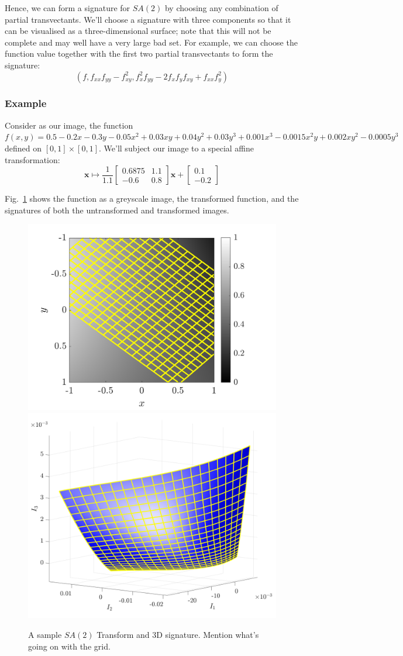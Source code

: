 \documentclass[review,onefignum,onetabnum]{siamonline190516}
\begin{document}
{Hence, we can form a signature for $SA(2)$ by choosing any combination of
partial transvectants. We'll choose a signature with three components so that
it can be visualised as a three-dimensional surface; note that this will not
be complete and may well have a very large bad set. For example, we can choose the function value together with the first two partial transvectants to form the signature:
\begin{equation*}
    \left(f, f_{xx}f_{yy}-f_{xy}^2, f_x^2f_{yy} - 2f_xf_yf_{xy} + f_{xx}f_y^2\right)
\end{equation*}

\subsubsection{Example}
Consider as our image, the function $f(x, y) = 0.5 - 0.2x - 0.3y - 0.05x^2 +
0.03xy + 0.04y^2 + 0.03y^3 +0.001x^3 - 0.0015x^2y + 0.002xy^2 - 0.0005y^3$
defined on $[0, 1]\times[0, 1]$.
We'll subject our image to a special affine transformation:
\begin{equation*}
\mathbf{x} \mapsto \frac{1}{1.1}\begin{bmatrix} 0.6875 & 1.1 \\ -0.6 & 0.8 \end{bmatrix}\mathbf{x} + \begin{bmatrix} 0.1 \\ -0.2 \end{bmatrix}
\end{equation*}

Fig.~\ref{fig:SA2} shows the function as a greyscale image, the transformed
function, and the signatures of both the untransformed and transformed
images.
\begin{figure}
\centering
\includegraphics[width=.45\textwidth]{Figs/f_transformed_SA2.png}
\includegraphics[width=.45\textwidth]{Figs/SA2_signature.png}
\caption{ A sample $SA(2)$ Transform and 3D signature. Mention what's going on with the grid.}
\label{fig:SA2}
\end{figure}


}
\end{document}

